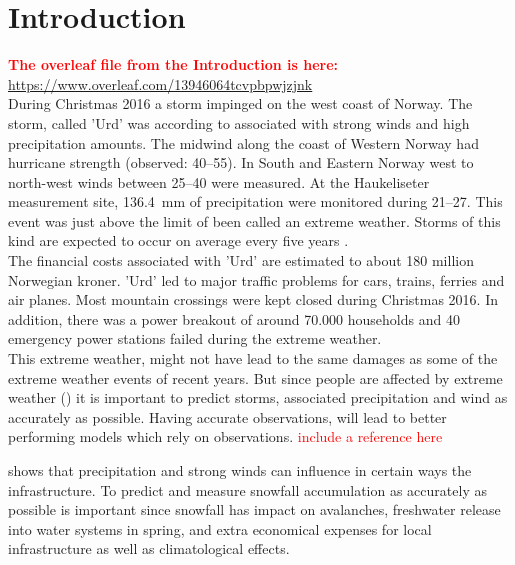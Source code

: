 \chapter{Introduction}
\label{ch:intro}
\textcolor{red}{\textbf{The overleaf file from the Introduction is here:} \\ \url{https://www.overleaf.com/13946064tcvpbpwjzjnk}}
\\
During Christmas 2016 a storm impinged on the west coast of Norway. The storm, called 'Urd' was according to \cite{olsen_ekstremvaerrapport._2017} associated with strong winds and high precipitation amounts. The midwind along the coast of Western Norway had hurricane strength (observed: \SIrange{40}{55}{\mPs}). In South and Eastern Norway west to north-west winds between \SIrange{25}{40}{\mPs} were measured. At the Haukeliseter measurement site, \SI{136.4}{\milli\metre} of precipitation were monitored during \SIrange{21}{27}{\dec}.
This event was just above the limit of been called an extreme weather. Storms of this kind are expected to occur on average every five years \citep{olsen_ekstremvaerrapport._2017}. \\ 
The financial costs associated with 'Urd' are estimated to about 180 million Norwegian kroner.
'Urd' led to major traffic problems for cars, trains, ferries and air planes. Most mountain crossings were kept closed during Christmas 2016. 
In addition, there was a power breakout of around 70.000 households and 40 emergency power stations failed during the extreme weather. 
\\
This extreme weather, might not have lead to the same damages as some of the extreme weather events of recent years. But since people are affected by extreme weather () it is important to predict storms, associated precipitation and wind as accurately as possible. Having accurate observations, will lead to better performing models which rely on observations. \textcolor{red}{include a reference here}

\newline
\noindent
{} shows that precipitation and strong winds can influence in certain ways the infrastructure. To predict and measure snowfall accumulation as accurately as possible is important since snowfall has impact on avalanches, freshwater release into water systems in spring, and extra economical expenses for local infrastructure as well as climatological effects. \\
